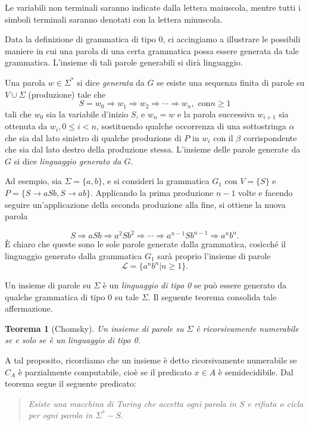 \documentclass[10pt]{\classname}
\newtheorem{thm}{Teorema}
\theoremstyle{definition}
\theoremstyle{definition}
\begin{document}
Le variabili non terminali saranno indicate dalla lettera maiuscola, mentre
tutti i simboli terminali saranno denotati con la lettera minuscola.

Data la definizione di grammatica di tipo 0, ci accingiamo a illustrare le
possibili maniere in cui una parola di una certa grammatica possa essere
generata da tale grammatica. L'insieme di tali parole generabili si dirà
linguaggio.

Una parola $w \in \Sigma^*$ si dice \emph{generata} da $G$ se esiste una
sequenza finita di parole su $V \cup \Sigma$ (produzione) tale che $$S = w_0
\Rightarrow w_1 \Rightarrow w_2 \Rightarrow \cdots \Rightarrow w_n, \mbox{ con
} n \geq 1$$ tali che $w_0$ sia la variabile d'inizio $S$, e $w_n = w$ e la
parola successiva $w_{i+1}$ sia ottenuta da $w_i, 0 \leq i < n$, sostituendo
qualche occorrenza di una sottostringa $\alpha$ che sia dal lato sinistro di
qualche produzione di $P$ in $w_i$ con il $\beta$ corrispondente che sia dal
lato destro della produzione stessa. L'insieme delle parole generate da $G$ si
dice \emph{linguaggio generato da $G$}.

Ad esempio, sia $\Sigma = \{a, b\}$, e si consideri la grammatica $G_1$ con $V
= \{S\}$ e $P = \{S \rightarrow aSb, S \rightarrow ab\}.$ Applicando la prima
produzione $n-1$ volte e facendo seguire un'applicazione della seconda
produzione alla fine, si ottiene la nuova parola

$$S \Rightarrow aSb \Rightarrow a^2Sb^2 \Rightarrow \cdots \Rightarrow
a^{n-1}Sb^{n-1} \Rightarrow a^{n}b^{n}.$$ È chiaro che queste sono le sole
parole generate dalla grammatica, cosìcché il linguaggio generato dalla
grammatica $G_1$ sarà proprio l'insieme di parole $$\mathcal L = \{a^n b^n | n\geq 1\}.$$

Un insieme di parole su $\Sigma$ è un \emph{linguaggio di tipo 0} se può essere
generato da qualche grammatica di tipo 0 su tale $\Sigma$. Il seguente teorema
consolida tale affermazione.

\begin{thm}[Chomsky]
    Un insieme di parole su $\Sigma$ è \emph{ricorsivamente numerabile} se e
    solo se è un linguaggio di tipo 0.
\end{thm}

A tal proposito, ricordiamo che un insieme è detto ricorsivamente numerabile se
$C_A$ è parzialmente computabile, cioè se il predicato $x \in A$ è
semidecidibile. Dal teorema segue il seguente predicato:

\begin{center}
\begin{quote}
    \emph{Esiste una macchina di Turing che accetta ogni parola in $S$ e rifiuta o
    cicla per ogni parola in $\Sigma^* - S$.}
\end{quote}
\end{center}
\end{document}
